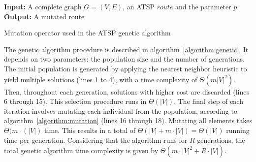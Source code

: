 \begin{algorithm}
  \textbf{Input:} A complete graph $G=(V,E)$, an ATSP $route$ and the parameter
  $p$ \\
  \textbf{Output:} A mutated route
  \begin{algorithmic}[1]
    \COMMENT{random real value in the range $[0, 1[$}
    \ENDWHILE
      \IF[random integer number in $[0, available[$]{$random(available) < needed$}
      \ENDIF
    \ENDWHILE
    \ENDFOR

      \ENDIF
    \ENDFOR

  \end{algorithmic}
  \caption{Mutation operator used in the ATSP genetic algorithm}
  \label{algorithm:mutation}
\end{algorithm}

\newpage
The genetic algorithm procedure is described in
algorithm~\ref{algorithm:genetic}. It depends on two parameters: the population
size and the number of generations. The initial population is generated by
applying the nearest neighbor heuristic to yield multiple solutions (lines 1 to
4), with a time complexity of $\Theta(m|V|^2)$. Then, throughout each
generation, solutions with higher cost are discarded (lines 6 through 15). This
selection procedure runs in $\Theta(|V|)$. The final step of each iteration
involves mutating each individual from the population, according to
algorithm~\ref{algorithm:mutation} (lines 16 through 18). Mutating all elements
takes $\Theta(m\cdot(|V|)$ time. This results in a total of
$\Theta(|V|+m\cdot|V|) = \Theta(|V|)$ running time per generation. Considering
that the algorithm runs for $R$ generations, the total genetic algorithm time
complexity is given by $\Theta(m\cdot|V|^2 + R\cdot|V|)$.


